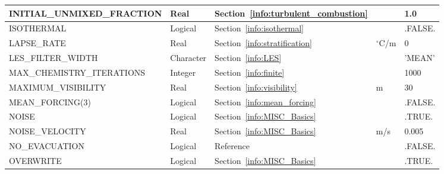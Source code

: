 \documentclass[11pt]{book}
\begin{document}
\begin{longtable}{@{\extracolsep{\fill}}|l|l|l|l|l|}
{\ct INITIAL\_UNMIXED\_FRACTION}                & Real          & Section~\ref{info:turbulent_combustion}               &               & 1.0                  \\ \hline
{\ct ISOTHERMAL}                                & Logical       & Section~\ref{info:isothermal}                         &               & {\ct .FALSE.}        \\ \hline
{\ct LAPSE\_RATE}                               & Real          & Section~\ref{info:stratification}                     &  $^\circ$C/m  & 0                 \\ \hline
{\ct LES\_FILTER\_WIDTH}                        & Character     & Section~\ref{info:LES}                                &               & {\ct 'MEAN'}      \\ \hline
{\ct MAX\_CHEMISTRY\_ITERATIONS}                & Integer       & Section~\ref{info:finite}                             &              &  1000             \\ \hline
{\ct MAXIMUM\_VISIBILITY}                       & Real          & Section~\ref{info:visibility}                         &  m            &  30               \\ \hline
{\ct MEAN\_FORCING(3)}                          & Logical       & Section~\ref{info:mean_forcing}                       &               & {\ct .FALSE.}     \\ \hline
{\ct NOISE}                                     & Logical       & Section~\ref{info:MISC_Basics}                        &               & {\ct .TRUE.}      \\ \hline
{\ct NOISE\_VELOCITY}                           & Real          & Section~\ref{info:MISC_Basics}                        &  m/s          & 0.005             \\ \hline
{\ct NO\_EVACUATION}                            & Logical       & Reference~\cite{FDS_Evac_Users_Guide}                 &               & {\ct .FALSE.}     \\ \hline
{\ct OVERWRITE}                                 & Logical       & Section~\ref{info:MISC_Basics}                        &               & {\ct .TRUE.}      \\ \hline

\end{longtable}
\end{document}
